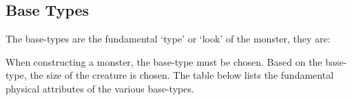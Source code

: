 \documentclass[twoside]{book}
\begin{document}
\subsection{Base Types}
     The base-types are the fundamental
               `type' or `look' of the monster,
               they are: 
\begin{description}
    
  \item[] 
  \item[] 
  \item[] 
  \item[] 
  \item[] 
  \item[] 
\end{description}
   When constructing a monster, the base-type must be
               chosen. Based on the base-type, the size of the creature
               is chosen. The table below lists the fundamental physical
               attributes of the various base-types. 
\end{document}

